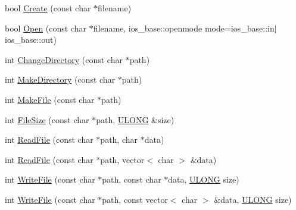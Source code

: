 \begin{DoxyCompactItemize}
\item 
bool \hyperlink{class_y_compound_files_1_1_compound_file_a12b9bb7ce39771cc233d4ff944df6181}{Create} (const char $\ast$filename)
\item 
bool \hyperlink{class_y_compound_files_1_1_compound_file_a66d3d1b8523a1ec9c43f0a8cd11190df}{Open} (const char $\ast$filename, ios\+\_\+base\+::openmode mode=ios\+\_\+base\+::in$\vert$ios\+\_\+base\+::out)
\item 
int \hyperlink{class_y_compound_files_1_1_compound_file_a5e1745f4a98a4da82d3c609392223fba}{Change\+Directory} (const char $\ast$path)
\item 
int \hyperlink{class_y_compound_files_1_1_compound_file_a973a7841893de0bfaad02be7d170be27}{Make\+Directory} (const char $\ast$path)
\item 
int \hyperlink{class_y_compound_files_1_1_compound_file_a772c378867d2734a55bfab5eca682c1c}{Make\+File} (const char $\ast$path)
\item 
int \hyperlink{class_y_compound_files_1_1_compound_file_ad9bc3b694a36fef87c76b1d6bdf89515}{File\+Size} (const char $\ast$path, \hyperlink{_basic_excel_8hpp_abe09d1bea023be6a07cbadde8e955435}{U\+L\+O\+N\+G} \&size)
\item 
int \hyperlink{class_y_compound_files_1_1_compound_file_ae19b936f56f36e02e958151befb3247c}{Read\+File} (const char $\ast$path, char $\ast$data)
\item 
int \hyperlink{class_y_compound_files_1_1_compound_file_a221d8fab5d542c5b71fd86707389724b}{Read\+File} (const char $\ast$path, vector$<$ char $>$ \&data)
\item 
int \hyperlink{class_y_compound_files_1_1_compound_file_ae61210da7aa1ebff0acfbc66bc29dfd1}{Write\+File} (const char $\ast$path, const char $\ast$data, \hyperlink{_basic_excel_8hpp_abe09d1bea023be6a07cbadde8e955435}{U\+L\+O\+N\+G} size)
\item 
int \hyperlink{class_y_compound_files_1_1_compound_file_adbf9ade5e8ccc8b0873e7a470d32918d}{Write\+File} (const char $\ast$path, const vector$<$ char $>$ \&data, \hyperlink{_basic_excel_8hpp_abe09d1bea023be6a07cbadde8e955435}{U\+L\+O\+N\+G} size)
\end{DoxyCompactItemize}
